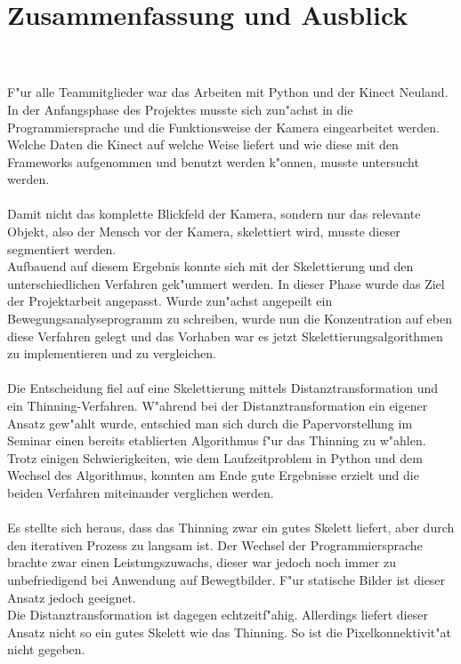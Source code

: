 \chapter{Zusammenfassung und Ausblick}
\label{ch:ausblick}
\\\\
F"ur alle Teammitglieder war das Arbeiten mit Python und der Kinect Neuland. In der Anfangsphase des Projektes musste sich zun"achst in die Programmiersprache und die Funktionsweise der Kamera eingearbeitet werden. Welche Daten die Kinect auf welche Weise liefert und wie diese mit den Frameworks aufgenommen und benutzt werden k"onnen, musste untersucht werden.\\\\
Damit nicht das komplette Blickfeld der Kamera, sondern nur das relevante Objekt, also der Mensch vor der Kamera, skelettiert wird, musste dieser segmentiert werden.\\Aufbauend auf diesem Ergebnis konnte sich mit der Skelettierung und den unterschiedlichen Verfahren gek"ummert werden. In dieser Phase wurde das Ziel der Projektarbeit angepasst. Wurde zun"achst angepeilt ein Bewegungsanalyseprogramm zu schreiben, wurde nun die Konzentration auf eben diese Verfahren gelegt und das Vorhaben war es jetzt Skelettierungsalgorithmen zu implementieren und zu vergleichen.\\\\Die Entscheidung fiel auf eine Skelettierung mittels Distanztransformation und ein Thinning-Verfahren. W"ahrend bei der Distanztransformation ein eigener Ansatz gew"ahlt wurde, entschied man sich durch die Papervorstellung im Seminar einen bereits etablierten Algorithmus f"ur das Thinning zu w"ahlen. Trotz einigen Schwierigkeiten, wie dem Laufzeitproblem in Python und dem Wechsel des Algorithmus, konnten am Ende gute Ergebnisse erzielt und die beiden Verfahren miteinander verglichen werden. \\\\
Es stellte sich heraus, dass das Thinning zwar ein gutes Skelett liefert, aber durch den iterativen Prozess zu langsam ist. Der Wechsel der Programmiersprache brachte zwar einen Leistungszuwachs, dieser war jedoch noch immer zu unbefriedigend bei Anwendung auf Bewegtbilder. F"ur statische Bilder ist dieser Ansatz jedoch geeignet. \\ Die Distanztransformation ist dagegen echtzeitf"ahig. Allerdings liefert dieser Ansatz nicht so ein gutes Skelett wie das Thinning. So ist die Pixelkonnektivit"at nicht gegeben. 
